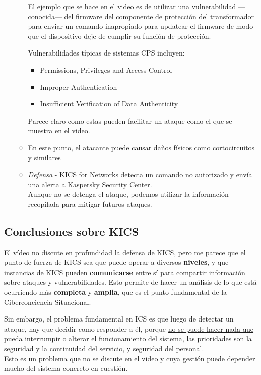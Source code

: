 \begin{enumerate}
\begin{itemize}
      El ejemplo que se hace en el video es de utilizar una vulnerabilidad ---conocida--- del firmware del componente de protección del transformador para enviar un comando inapropiado para updatear el firmware de modo que el dispositivo deje de cumplir su función de protección.\\
      {Vulnerabilidades típicas de sistemas CPS incluyen:\ns
      \begin{itemize}
      	\item Permissions, Privileges and Access Control
	      \item Improper Authentication
	      \item Insufficient Verification of Data Authenticity
      \end{itemize}
      Parece claro como estas pueden facilitar un ataque como el que se muestra en el video.}
      \item En este punto, el atacante puede causar daños físicos como cortocircuitos y similares
      \item \textit{\ul{Defensa}} - KICS for Networks detecta un comando no autorizado y envía una alerta a Kaspersky Security Center.\\
      Aunque no se detenga el ataque, podemos utilizar la información recopilada para mitigar futuros ataques.
   \end{itemize}
\end{enumerate}


\subsection{Conclusiones sobre KICS}
El vídeo no discute en profundidad la defensa de KICS, pero me parece que el punto de fuerza de KICS sea que puede operar a diversos \textbf{niveles}, y que instancias de KICS pueden \textbf{comunicarse} entre sí para compartir información sobre ataques y vulnerabilidades.
Esto permite de hacer un análisis de lo que está ocurriendo más \textbf{completa} y \textbf{amplia}, que es el punto fundamental de la Ciberconciencia Situacional.

Sin embargo, el problema fundamental en ICS es que luego de detectar un ataque, hay que decidir como responder a él, porque \ul{no se puede hacer nada que pueda interrumpir o alterar el funcionamiento del sístema}, las prioridades son la seguridad y la continuidad del servicio, y seguridad del personal.\\
Esto es un problema que no se discute en el video y cuya gestión puede depender mucho del sistema concreto en cuestión.